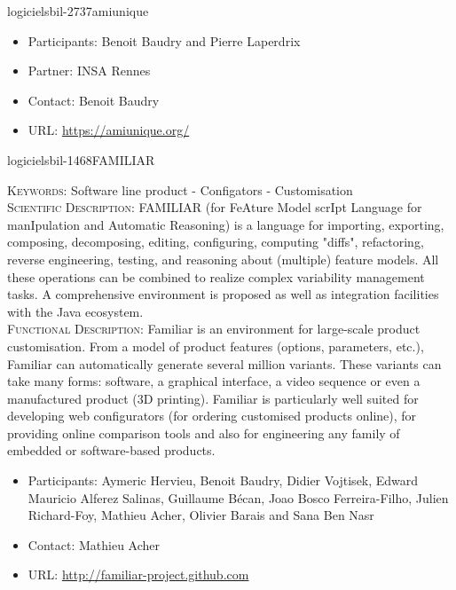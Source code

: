 \documentclass{ra2018}
\begin{document}
\begin{module}{logiciels}{bil-2737}{amiunique}
   \begin{itemize}
      \item Participants: Benoit Baudry and Pierre Laperdrix
      \item Partner: INSA Rennes
      \item Contact: Benoit Baudry
      \item URL: \url{https://amiunique.org/}
   \end{itemize}

 \end{module}

 \begin{module}{logiciels}{bil-1468}{FAMILIAR}

   \textsc{Keywords:} Software line product - Configators - Customisation \\ 


    \textsc{Scientific Description:} FAMILIAR (for FeAture Model scrIpt Language for manIpulation and Automatic Reasoning) is a language for importing, exporting, composing, decomposing, editing, configuring, computing "diffs", refactoring, reverse engineering, testing, and reasoning about (multiple) feature models. All these operations can be combined to realize complex variability management tasks. 
A comprehensive environment is proposed as well as integration facilities with the Java ecosystem.\\

 \textsc{Functional Description:}  Familiar is an environment for large-scale product customisation. From a model of product features (options, parameters, etc.), Familiar can automatically generate several million variants. These variants can take many forms: software, a graphical interface, a video sequence or even a manufactured product (3D printing). Familiar is particularly well suited for developing web configurators (for ordering customised products online), for providing online comparison tools and also for engineering any family of embedded or software-based products.\\

   \begin{itemize}
      \item Participants: Aymeric Hervieu, Benoit Baudry, Didier Vojtisek, Edward Mauricio Alferez Salinas, Guillaume Bécan, Joao Bosco Ferreira-Filho, Julien Richard-Foy, Mathieu Acher, Olivier Barais and Sana Ben Nasr
      \item Contact: Mathieu Acher
      \item URL: \url{http://familiar-project.github.com}
   \end{itemize}

 \end{module}
\end{document}
